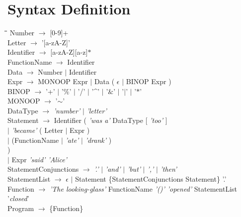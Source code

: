 \documentclass[a4wide, 11pt]{article}
\begin{document}
\section{Syntax Definition}
\label{sec:bnf}
	\begin{tabbing}
	\hspace*{8mm}\=\hspace*{25mm}\=\hspace*{15mm}\=\hspace*{2mm}\=\kill
		\> Number $\rightarrow$ [0-9]+ \\
		\> Letter $\rightarrow$ '[a-zA-Z]' \\
		\> Identifier $\rightarrow$ [a-zA-Z][a-z]$\ast$ \\
		\> FunctionName $\rightarrow$ Identifier \\
		\> Data $\rightarrow$ Number $\mid$ Identifier \\
		\> Expr	$\rightarrow$ MONOOP Expr $\mid$ Data ( $\epsilon$ $\mid$ BINOP Expr )\\
		\> BINOP $\rightarrow$ '+' $\mid$ '$\%$' $\mid$ '/' $\mid$ '\^{ }' 
							$\mid$ '$\&$' $\mid$ '$\mid$' $\mid$ '$\ast$' \\
		\> MONOOP $\rightarrow$ '$\mathtt{\sim}$'\\

		\> DataType $\rightarrow$ \emph{'number'} $\mid$ \emph{'letter'} \\
		
		\> Statement $\rightarrow$ Identifier ( \emph{'was a'} DataType [ \emph{'too'} ]\\
		\> \> \> \> $\mid$  \emph{'became'} ( Letter $\mid$ Expr ) \\
		\> \> \> \> $\mid$  (FunctionName $\mid$ \emph{'ate'} $\mid$ \emph{'drank'} ) \\
		\> \> \> )  \\
		\> \>	$\mid$ Expr \emph{'said' 'Alice'} \\
	
				
		\> StatementConjunctions $\rightarrow$ \emph{'.'} $\mid$ \emph{'and'} $\mid$ \emph{'but'} $\mid$ \emph{','} $\mid$ \emph{'then'} \\
		\> StatementList $\rightarrow$ $\epsilon$ $\mid$ Statement \{StatementConjunctions Statement\} '.' \\

		\> Function $\rightarrow$ \emph{'The looking-glass'} FunctionName  \emph{'()' 'opened' } StatementList '\emph{closed}' \\
		\> Program $\rightarrow$ \{Function\}
	\end{tabbing}
	
\end{document}

